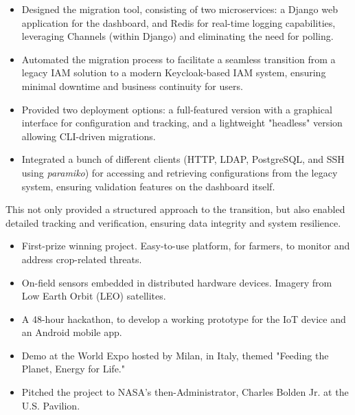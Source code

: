 	\divider

	\newline
	\begin{itemize}
		\item Designed the migration tool, consisting of two microservices: a Django web application for the dashboard, and Redis for real-time logging capabilities, leveraging Channels (within Django) and eliminating the need for polling.
		\item Automated the migration process to facilitate a seamless transition from a legacy IAM solution to a modern Keycloak-based IAM system, ensuring minimal downtime and business continuity for users.
		\item Provided two deployment options: a full-featured version with a graphical interface for configuration and tracking, and a lightweight "headless" version allowing CLI-driven migrations.
		\item Integrated a bunch of different clients (HTTP, LDAP, PostgreSQL, and SSH using \emph{paramiko}) for accessing and retrieving configurations from the legacy system, ensuring validation features on the dashboard itself.
	\end{itemize}
	\smallskip
	This not only provided a structured approach to the transition, but also enabled detailed tracking and verification, ensuring data integrity and system resilience.

	\divider

	\newline
	\begin{itemize}
		\item First-prize winning project. Easy-to-use platform, for farmers, to monitor and address crop-related threats.
		\item On-field sensors embedded in distributed hardware devices. Imagery from Low Earth Orbit (LEO) satellites.
		\item A 48-hour hackathon, to develop a working prototype for the IoT device and an Android mobile app.
		\item Demo at the World Expo hosted by Milan, in Italy, themed "Feeding the Planet, Energy for Life."
		\item Pitched the project to NASA’s then-Administrator, Charles Bolden Jr. at the U.S. Pavilion.
	\end{itemize}


